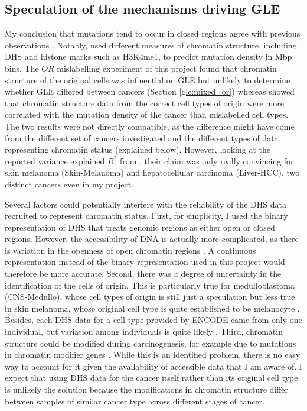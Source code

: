 \subsection{Speculation of the mechanisms driving GLE}
My conclusion that mutations tend to occur in closed regions agree with previous observations \citep{Polak2015,Fujimoto2016Whole-genomeCancer,Prendergast2007ChromatinGenome}. Notably, \citet{Polak2015} used different measures of chromatin structure, including DHS and histone marks such as H3K4me1, to predict mutation density in Mbp bins. The $OR$ mislabelling experiment of this project found that chromatin structure of the original cells was influential on GLE but unlikely to determine whether GLE differed between cancers (Section \ref{gle:mixed_or}) whereas \citet{Polak2015} showed that chromatin structure data from the correct cell types of origin were more correlated with the mutation density of the cancer than mislabelled cell types. The two results were not directly compatible, as the difference might have come from the different set of cancers investigated and the different types of data representing chromatin status (explained below). However, looking at the reported variance explained $R^2$ from \citet{Polak2015}, their claim was only really convincing for skin melanoma (Skin-Melanoma) and hepatocellular carcinoma (Liver-HCC), two distinct cancers even in my project. 

Several factors could potentially interfere with the reliability of the DHS data recruited to represent chromatin status. First, for simplicity, I used the binary representation of DHS that treats genomic regions as either open or closed regions. However, the accessibility of DNA is actually more complicated, as there is variation in the openness of open chromatin regions \citep{Boyle2008High-ResolutionGenome}. A continuous representation instead of the binary representation used in this project would therefore be more accurate. Second, there was a degree of uncertainty in the identification of the cells of origin. This is particularly true for medulloblastoma (CNS-Medullo), whose cell types of origin is still just a speculation \citep{Penas2015TheMedulloblastoma} but less true in skin melanoma, whose original cell type is quite established to be melanocyte \citep{Lin2007MelanocytePigmentation}. Besides, each DHS data for a cell type provided by ENCODE came from only one individual, but variation among individuals is quite likely \citep{Thurman2012TheGenome}. Third, chromatin structure could be modified during carcinogenesis, for example due to mutations in chromatin modifier genes \citep{Makova2015TheGenome}. While this is an identified problem, there is no easy way to account for it given the availability of accessible data that I am aware of. I expect that using DHS data for the cancer itself rather than its original cell type is unlikely the solution because the modifications in chromatin structure differ between samples of similar cancer type across different stages of cancer. 

